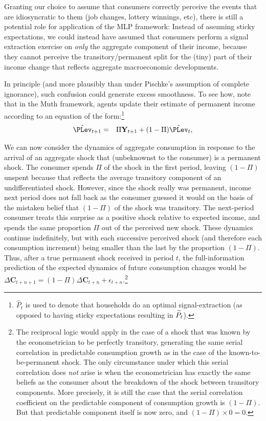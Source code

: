 \documentclass[titlepage]{\econtex}\newcommand{\texname}{cAndCwithStickyE}
\begin{document}
Granting our choice to assume that consumers correctly perceive the events that are idiosyncratic to them (job changes, lottery winnings, etc), there is still a potential role for application of the MLP framework:  Instead of assuming sticky expectations, we could instead have assumed that consumers perform a signal extraction exercise on \textit{only} the aggregate component of their income, because they cannot perceive the transitory/permanent split for the (tiny) part of their income change that reflects aggregate macroeconomic developments.

In principle (and more plausibly than under Pischke's assumption of complete ignorance), such confusion could generate excess smoothness.  To see how, note that in the Muth framework, agents update their estimate of permanent income according to an equation of the form:\footnote{$\hat{P}_t$ is used to denote that households do an optimal signal-extraction (as opposed to having sticky expectations resulting in $\widetilde{P}_t$).}
\begin{eqnarray}
  \label{eq:PischkeP}
  \hat{\PLev}_{t+1} & = & \Pi \mathbf{Y}_{t+1}+(1-\Pi) \hat{\PLev}_{t},
\end{eqnarray}

We can now consider the dynamics of aggregate consumption in response to the arrival of an aggregate shock that (unbeknownst to the consumer) is a permanent shock.  The consumer spends $\Pi$ of the shock in the first period, leaving $(1-\Pi)$ unspent because that reflects the average transitory component of an undifferentiated shock.  However, since the shock really was permanent, income next period does not fall back as the consumer guessed it would on the basis of the mistaken belief that $(1-\Pi)$ of the shock was transitory.  The next-period consumer treats this surprise as a positive shock relative to expected income, and spends the same proportion $\Pi$ out of the perceived new shock.  These dynamics continue indefinitely, but with each successive perceived shock (and therefore each consumption increment) being smaller than the last by the proportion $(1-\Pi)$.  Thus, after a true permanent shock received in period $t$, the full-information prediction of the expected dynamics of future consumption changes would be $\Delta \mathbf{C}_{t+n+1} = (1-\Pi)  \Delta \mathbf{C}_{t+n} + \epsilon_{t+n}$.\footnote{The reciprocal logic would apply in the case of a shock that was known by the econometrician to be perfectly transitory, generating the same serial correlation in predictable consumption growth as in the case of the known-to-be-permanent shock.  The only circumstance under which this serial correlation does {\it not} arise is when the econometrician has exactly the same beliefs as the consumer about the breakdown of the shock between transitory components.  More precisely, it is still the case that the serial correlation coefficient on the predictable component of consumption growth is $(1-\Pi)$.  But that predictable component itself is now zero, and $(1-\Pi)\times0=0$.}
\end{document}
